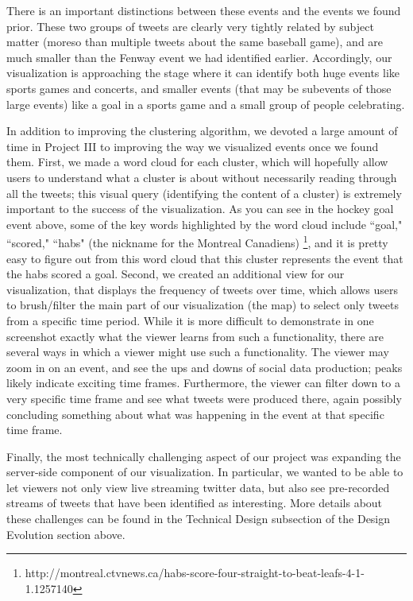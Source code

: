 \documentclass[pdftex,12pt,a4paper]{article}
\begin{document}
There is an important distinctions between these events and the events we found prior. These two groups of tweets are clearly very tightly related by subject matter (moreso than multiple tweets about the same baseball game), and are much smaller than the Fenway event we had identified earlier. Accordingly, our visualization is approaching the stage where it can identify both huge events like sports games and concerts, and smaller events (that may be subevents of those large events) like a goal in a sports game and a small group of people celebrating.

In addition to improving the clustering algorithm, we devoted a large amount of time in Project III to improving the way we visualized events once we found them. First, we made a word cloud for each cluster, which will hopefully allow users to understand what a cluster is about without necessarily reading through all the tweets; this visual query (identifying the content of a cluster) is extremely important to the success of the visualization. As you can see in the hockey goal event above, some of the key words highlighted by the word cloud include ``goal," ``scored," ``habs" (the nickname for the Montreal Canadiens) \footnote{http://montreal.ctvnews.ca/habs-score-four-straight-to-beat-leafs-4-1-1.1257140}, and it is pretty easy to figure out from this word cloud that this cluster represents the event that the habs scored a goal. Second, we created an additional view for our visualization, that displays the frequency of tweets over time, which allows users to brush/filter the main part of our visualization (the map) to select only tweets from a specific time period. While it is more difficult to demonstrate in one screenshot exactly what the viewer learns from such a functionality, there are several ways in which a viewer might use such a functionality. The viewer may zoom in on an event, and see the ups and downs of social data production; peaks likely indicate exciting time frames. Furthermore, the viewer can filter down to a very specific time frame and see what tweets were produced there, again possibly concluding something about what was happening in the event at that specific time frame. 

Finally, the most technically challenging aspect of our project was expanding the server-side component of our visualization. In particular, we wanted to be able to let viewers not only view live streaming twitter data, but also see pre-recorded streams of tweets that have been identified as interesting. More details about these challenges can be found in the Technical Design subsection of the Design Evolution section above.
\end{document}
